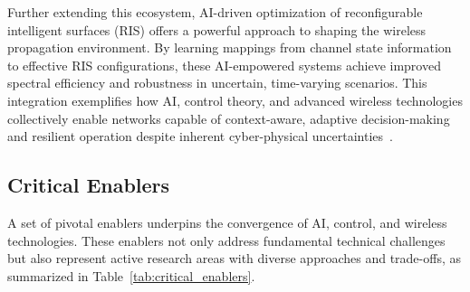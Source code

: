 \documentclass[sigconf]{acmart}
\begin{document}
Further extending this ecosystem, AI-driven optimization of reconfigurable intelligent surfaces (RIS) offers a powerful approach to shaping the wireless propagation environment. By learning mappings from channel state information to effective RIS configurations, these AI-empowered systems achieve improved spectral efficiency and robustness in uncertain, time-varying scenarios. This integration exemplifies how AI, control theory, and advanced wireless technologies collectively enable networks capable of context-aware, adaptive decision-making and resilient operation despite inherent cyber-physical uncertainties~\cite{ref48}.

\subsection{Critical Enablers}

A set of pivotal enablers underpins the convergence of AI, control, and wireless technologies. These enablers not only address fundamental technical challenges but also represent active research areas with diverse approaches and trade-offs, as summarized in Table~\ref{tab:critical_enablers}.
\end{document}
